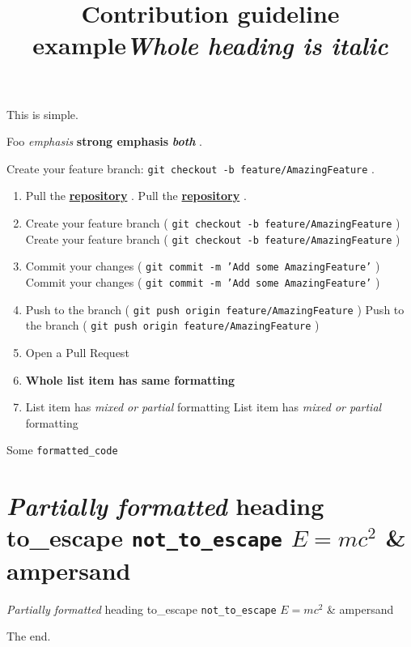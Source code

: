 \documentclass[11pt,a4paper]{article}
\title{Contribution guideline example}
\begin{document}
\maketitle

This is simple.

Foo \textit{emphasis} \textbf{strong emphasis} \textit{\textbf{both}} .

Create your feature branch: \texttt{git checkout -b feature/AmazingFeature} .

\begin{enumerate}
\item Pull the \href{https://github.com/docling-project/docling}{\textbf{repository}} .
Pull the \href{https://github.com/docling-project/docling}{\textbf{repository}} .
\item Create your feature branch ( \texttt{git checkout -b feature/AmazingFeature} )
Create your feature branch ( \texttt{git checkout -b feature/AmazingFeature} )
\item Commit your changes ( \texttt{git commit -m 'Add some AmazingFeature'} )
Commit your changes ( \texttt{git commit -m 'Add some AmazingFeature'} )
\item Push to the branch ( \texttt{git push origin feature/AmazingFeature} )
Push to the branch ( \texttt{git push origin feature/AmazingFeature} )
\item Open a Pull Request
\item \textbf{Whole list item has same formatting}
\item List item has \textit{mixed or partial} formatting
List item has \textit{mixed or partial} formatting
\end{enumerate}

\title{\textit{Whole heading is italic}}

Some \texttt{formatted_code}

\section{\textit{Partially formatted} heading to\_escape \texttt{not_to_escape} $E=mc^2$ \& ampersand}

\textit{Partially formatted} heading to\_escape \texttt{not_to_escape} $E=mc^2$ \& ampersand

The end.
\end{document}
